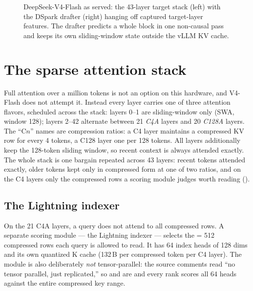 \begin{figure}[htbp]
\caption{DeepSeek-V4-Flash as served: the 43-layer target stack (left) with the
DSpark drafter (right) hanging off captured target-layer features. The drafter
predicts a whole block in one non-causal pass and keeps its own sliding-window
state outside the vLLM KV cache.}
\label{fig:model-block}
\end{figure}

\section{The sparse attention stack}
\label{sec:model-sparse}

Full attention over a million tokens is not an option on this hardware, and
V4-Flash does not attempt it. Instead every layer carries one of three
attention flavors, scheduled across the stack: layers 0--1 are sliding-window
only (SWA, window 128); layers 2--42 alternate between 21 \emph{C4A} layers
and 20 \emph{C128A} layers. The ``C$n$'' names are compression ratios: a C4
layer maintains a compressed KV row for every 4 tokens, a C128 layer one per
128 tokens. All layers additionally keep the 128-token sliding window, so
recent context is always attended exactly. The whole stack is one bargain
repeated across 43 layers: recent tokens attended exactly, older tokens kept
only in compressed form at one of two ratios, and on the C4 layers only the
compressed rows a scoring module judges worth reading
().

\subsection{The Lightning indexer}

On the 21 C4A layers, a query does not attend to all compressed rows. A
separate scoring module --- the Lightning indexer --- selects the
 = 512 compressed rows each query is allowed to read. It has
64 index heads of 128 dims and its own quantized K cache (132\,B per
compressed token per C4 layer). The module is also deliberately \emph{not}
tensor-parallel: the source comments read ``no tensor parallel, just
replicated,'' so  and  are
 and every rank scores all 64 heads against the
entire compressed key range.

